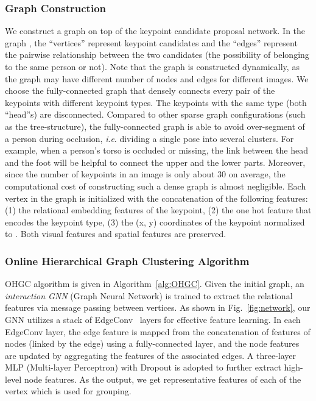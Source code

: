\documentclass[runningheads]{llncs}
\newcommand{\ie}{\textit{i}.\textit{e}. }
\begin{document}
	\subsubsection{Graph Construction}
	We construct a graph on top of the keypoint candidate proposal network. In the graph  , the ``vertices''  represent keypoint candidates and the ``edges''  represent the pairwise relationship between the two candidates (the possibility of belonging to the same person or not). Note that the graph is constructed dynamically, as the graph may have different number of nodes and edges for different images. We choose the fully-connected graph that densely connects every pair of the keypoints with different keypoint types. The keypoints with the same type (both ``head''s) are disconnected. Compared to other sparse graph configurations (such as the tree-structure), the fully-connected graph is able to avoid over-segment of a person during occlusion, \ie dividing a single pose into several clusters. For example, when a person's torso is occluded or missing, the link between the head and the foot will be helpful to connect the upper and the lower parts. Moreover, since the number of keypoints in an image is only about 30 on average, the computational cost of constructing such a dense graph is almost negligible. Each vertex  in the graph is initialized with the concatenation of the following features: (1) the relational embedding features of the keypoint, (2) the one hot feature that encodes the keypoint type, (3) the (x, y) coordinates of the keypoint normalized to . Both visual features and spatial features are preserved.
	
	\subsubsection{Online Hierarchical Graph Clustering Algorithm}
	OHGC algorithm is given in Algorithm~\ref{alg:OHGC}. Given the initial graph, an \emph{interaction GNN} (Graph Neural Network) is trained to extract the relational features via message passing between vertices. As shown in Fig.~\ref{fig:network}, our GNN utilizes a stack of EdgeConv~\cite{wang2019dynamic} layers for effective feature learning. In each EdgeConv layer, the edge feature is mapped from the concatenation of features of nodes (linked by the edge) using a fully-connected layer, and the node features are updated by aggregating the features of the associated edges. A three-layer MLP (Multi-layer Perceptron) with Dropout is adopted to further extract high-level node features. As the output, we get representative features of each of the vertex which is used for grouping.
	
\end{document}
